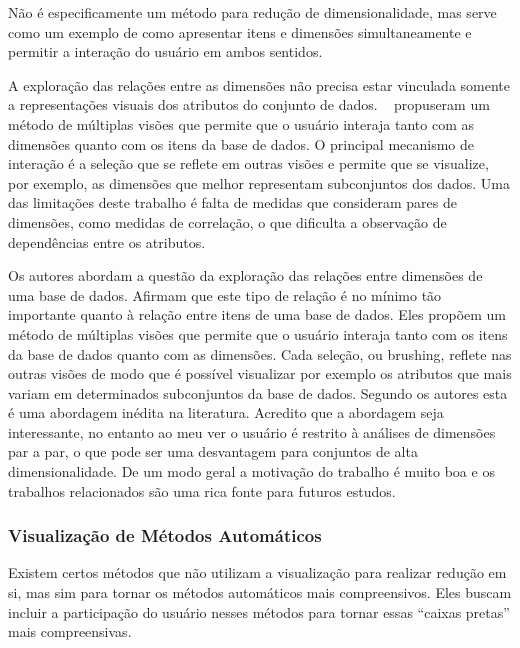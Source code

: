 
Não é especificamente um método para redução de dimensionalidade, mas serve como um exemplo de como apresentar itens e dimensões simultaneamente e permitir a interação do usuário em ambos sentidos.

A exploração das relações entre as dimensões não precisa estar vinculada somente a representações visuais dos atributos do conjunto de dados. \citeauthor{Turkay2011}~\cite{Turkay2011} propuseram um método de múltiplas visões que permite que o usuário interaja tanto com as dimensões quanto com os itens da base de dados. O principal mecanismo de interação é a seleção que se reflete em outras visões e permite que se visualize, por exemplo, as dimensões que melhor representam subconjuntos dos dados. Uma das limitações deste trabalho é falta de medidas que consideram pares de dimensões, como medidas de correlação, o que dificulta a observação de dependências entre os atributos.  

Os autores abordam a questão da exploração das relações entre dimensões de uma base de dados. Afirmam que este tipo de relação é no mínimo tão importante quanto à relação entre itens de uma base de dados. Eles propõem um método de múltiplas visões que permite que o usuário interaja tanto com os itens da base de dados quanto com as dimensões. Cada seleção, ou brushing, reflete nas outras visões de modo que é possível visualizar por exemplo os atributos que mais variam em determinados subconjuntos da base de dados. Segundo os autores esta é uma abordagem inédita na literatura. Acredito que a abordagem seja interessante, no entanto ao meu ver o usuário é restrito à análises de dimensões par a par, o que pode ser uma desvantagem para conjuntos de alta dimensionalidade. De  um modo geral a motivação do trabalho é muito boa e os trabalhos relacionados são uma rica fonte para futuros estudos.

\subsubsection{Visualização de Métodos Automáticos}

Existem certos métodos que não utilizam a visualização para realizar redução em si, mas sim para tornar os métodos automáticos mais compreensivos. Eles buscam incluir a participação do usuário nesses métodos para tornar essas ``caixas pretas'' mais compreensivas. 

